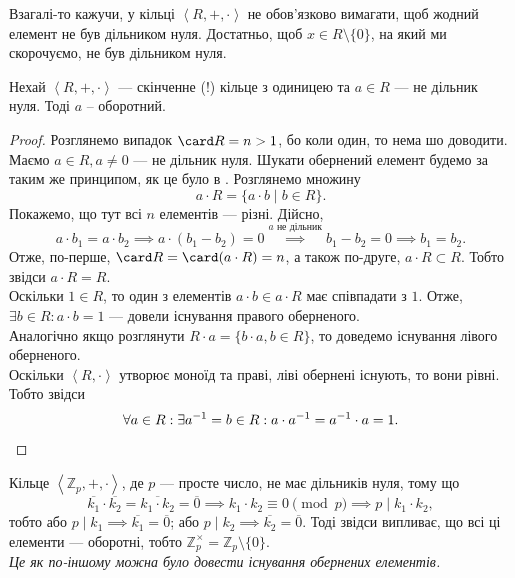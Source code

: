 \documentclass{math_library}
\begin{document}
\begin{remark}
Взагалі-то кажучи, у кільці $\left<R, +, \cdot\right>$ не обов'язково вимагати, щоб жодний елемент не був дільником нуля. Достатньо, щоб $x \in R \setminus \{0\}$, на який ми скорочуємо, не був дільником нуля.
\end{remark}

\begin{theorem}
\label{in_finite_ring_non_zero_divisors_are_inverses}
Нехай $\left<R,+,\cdot \right>$ --- скінченне (!) кільце з одиницею та $a \in R$ --- не дільник нуля. Тоді $a$ -- оборотний.
\end{theorem}

\begin{proof}
Розглянемо випадок $\card R = n > 1$, бо коли один, то нема шо доводити.\\
Маємо $a \in R, a \neq 0$ --- не дільник нуля. Шукати обернений елемент будемо за таким же принципом, як це було в . Розглянемо множину 
\[
a \cdot R = \{a \cdot b \mid b \in R\}.
\]
Покажемо, що тут всі $n$ елементів --- різні. Дійсно,
\[
a \cdot b_1 = a \cdot b_2 \implies a \cdot (b_1-b_2) = 0 \overset{a \text{ не дільник}}{\implies} b_1-b_2 = 0 \implies b_1 = b_2.
\]
Отже, по-перше, $\card R = \card(a \cdot R) = n$, а також по-друге, $a \cdot R \subset R$. Тобто звідси $a \cdot R = R$.\\
Оскільки $1 \in R$, то один з елементів $a \cdot b \in a \cdot R$ має співпадати з $1$. Отже, $\exists b \in R: a \cdot b = 1$ --- довели існування правого оберненого.\\
Аналогічно якщо розглянути $R \cdot a = \{b \cdot a, b \in R \}$, то доведемо існування лівого оберненого.\\
Оскільки $\left<R, \cdot \right>$ утворює моноїд та праві, ліві обернені існують, то вони рівні. Тобто звідси
\[
\forall a \in R: \exists a^{-1} = b \in R: a \cdot a^{-1} = a^{-1} \cdot a = 1. \qedhere
\]
\end{proof}

\begin{example}
Кільце $\left<\mathbb{Z}_p, +, \cdot \right>$, де $p$ --- просте число, не має дільників нуля, тому що
\[
\overline{k_1} \cdot \overline{k_2} = \overline{k_1 \cdot k_2} = \overline{0} \implies k_1 \cdot k_2 \equiv 0 \pmod p \implies p \mid k_1 \cdot k_2,
\]
тобто або $p \mid k_1 \implies \overline{k_1} = \overline{0}$; або $p \mid k_2 \implies \overline{k_2} = \overline{0}$. Тоді звідси випливає, що всі ці елементи --- оборотні, тобто $\mathbb{Z}_p^\times = \mathbb{Z}_p \setminus \{0\}$.\\
\textit{Це як по-іншому можна було довести існування обернених елементів.}
\end{example}
\end{document}
